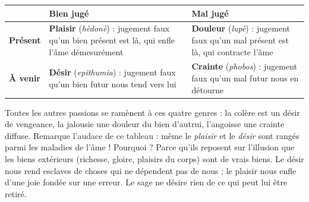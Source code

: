 \documentclass[11pt]{article}
\begin{document}
\begin{center}
\begin{tabularx}{\linewidth}{|l|X|X|}
\hline
\rowcolor{popblueL}
 & \textbf{Bien jugé} & \textbf{Mal jugé} \\
\hline
\textbf{Présent} & \textbf{Plaisir} (\emph{hèdonè}) : jugement faux qu'un bien présent est là, qui enfle l'âme démesurément & \textbf{Douleur} (\emph{lupè}) : jugement faux qu'un mal présent est là, qui contracte l'âme \\
\hline
\textbf{À venir} & \textbf{Désir} (\emph{epithumia}) : jugement faux qu'un bien futur nous tend vers lui & \textbf{Crainte} (\emph{phobos}) : jugement faux qu'un mal futur nous en détourne \\
\hline
\end{tabularx}
\end{center}

Toutes les autres passions se ramènent à ces quatre genres : la colère est un désir de vengeance, la jalousie une douleur du bien d'autrui, l'angoisse une crainte diffuse. Remarque l'audace de ce tableau : même le \emph{plaisir} et le \emph{désir} sont rangés parmi les maladies de l'âme ! Pourquoi ? Parce qu'ils reposent sur l'illusion que les biens extérieurs (richesse, gloire, plaisirs du corps) sont de vrais biens. Le désir nous rend esclaves de choses qui ne dépendent pas de nous ; le plaisir nous enfle d'une joie fondée sur une erreur. Le sage ne désire rien de ce qui peut lui être retiré.
\end{document}
